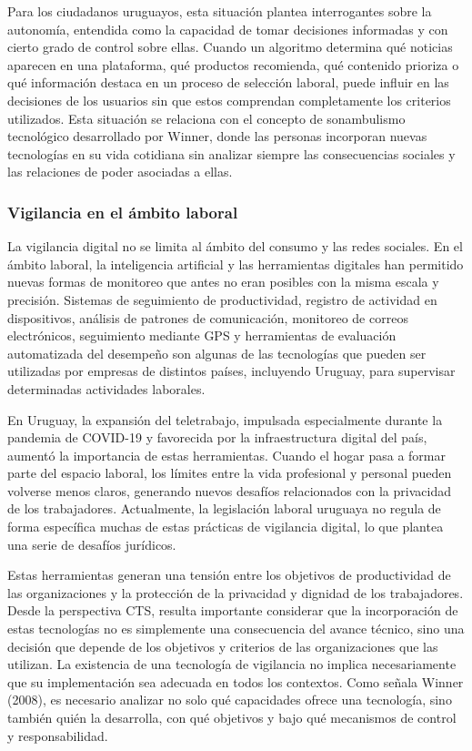 \documentclass[11pt,a4paper]{article}
\begin{document}
Para los ciudadanos uruguayos, esta situación plantea interrogantes sobre la autonomía, entendida como la capacidad de tomar decisiones informadas y con cierto grado de control sobre ellas. Cuando un algoritmo determina qué noticias aparecen en una plataforma, qué productos recomienda, qué contenido prioriza o qué información destaca en un proceso de selección laboral, puede influir en las decisiones de los usuarios sin que estos comprendan completamente los criterios utilizados. Esta situación se relaciona con el concepto de sonambulismo tecnológico desarrollado por Winner, donde las personas incorporan nuevas tecnologías en su vida cotidiana sin analizar siempre las consecuencias sociales y las relaciones de poder asociadas a ellas.

\subsubsection{Vigilancia en el ámbito laboral}

La vigilancia digital no se limita al ámbito del consumo y las redes sociales. En el ámbito laboral, la inteligencia artificial y las herramientas digitales han permitido nuevas formas de monitoreo que antes no eran posibles con la misma escala y precisión. Sistemas de seguimiento de productividad, registro de actividad en dispositivos, análisis de patrones de comunicación, monitoreo de correos electrónicos, seguimiento mediante GPS y herramientas de evaluación automatizada del desempeño son algunas de las tecnologías que pueden ser utilizadas por empresas de distintos países, incluyendo Uruguay, para supervisar determinadas actividades laborales.

En Uruguay, la expansión del teletrabajo, impulsada especialmente durante la pandemia de COVID-19 y favorecida por la infraestructura digital del país, aumentó la importancia de estas herramientas. Cuando el hogar pasa a formar parte del espacio laboral, los límites entre la vida profesional y personal pueden volverse menos claros, generando nuevos desafíos relacionados con la privacidad de los trabajadores. Actualmente, la legislación laboral uruguaya no regula de forma específica muchas de estas prácticas de vigilancia digital, lo que plantea una serie de desafíos jurídicos.

Estas herramientas generan una tensión entre los objetivos de productividad de las organizaciones y la protección de la privacidad y dignidad de los trabajadores. Desde la perspectiva CTS, resulta importante considerar que la incorporación de estas tecnologías no es simplemente una consecuencia del avance técnico, sino una decisión que depende de los objetivos y criterios de las organizaciones que las utilizan. La existencia de una tecnología de vigilancia no implica necesariamente que su implementación sea adecuada en todos los contextos. Como señala Winner (2008), es necesario analizar no solo qué capacidades ofrece una tecnología, sino también quién la desarrolla, con qué objetivos y bajo qué mecanismos de control y responsabilidad.
\end{document}
